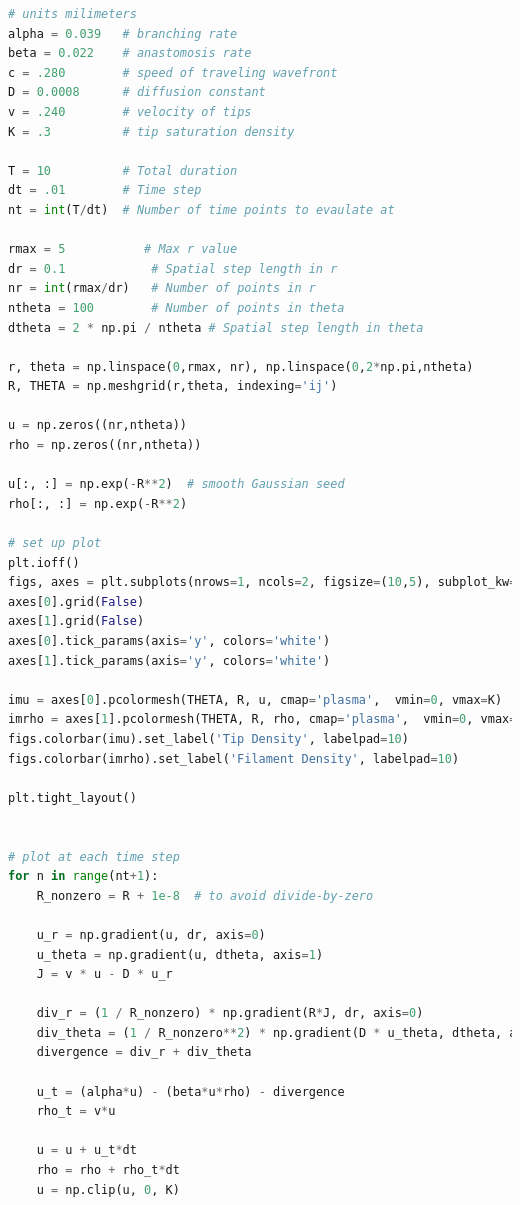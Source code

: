 \documentclass{article}
\begin{document}
\hypertarget{BA}{}
\begin{lstlisting}[language=Python, caption=Tip and Filament Density (with Branching and Anastomosis) Code]
# units milimeters
alpha = 0.039   # branching rate
beta = 0.022    # anastomosis rate 
c = .280        # speed of traveling wavefront
D = 0.0008      # diffusion constant 
v = .240        # velocity of tips
K = .3          # tip saturation density

T = 10          # Total duration
dt = .01        # Time step
nt = int(T/dt)  # Number of time points to evaulate at

rmax = 5           # Max r value
dr = 0.1            # Spatial step length in r
nr = int(rmax/dr)   # Number of points in r
ntheta = 100        # Number of points in theta
dtheta = 2 * np.pi / ntheta # Spatial step length in theta

r, theta = np.linspace(0,rmax, nr), np.linspace(0,2*np.pi,ntheta)
R, THETA = np.meshgrid(r,theta, indexing='ij')

u = np.zeros((nr,ntheta))
rho = np.zeros((nr,ntheta))

u[:, :] = np.exp(-R**2)  # smooth Gaussian seed
rho[:, :] = np.exp(-R**2)

# set up plot
plt.ioff()
figs, axes = plt.subplots(nrows=1, ncols=2, figsize=(10,5), subplot_kw={'projection': 'polar'})
axes[0].grid(False)
axes[1].grid(False)
axes[0].tick_params(axis='y', colors='white') 
axes[1].tick_params(axis='y', colors='white') 

imu = axes[0].pcolormesh(THETA, R, u, cmap='plasma',  vmin=0, vmax=K)
imrho = axes[1].pcolormesh(THETA, R, rho, cmap='plasma',  vmin=0, vmax=1.5)
figs.colorbar(imu).set_label('Tip Density', labelpad=10)
figs.colorbar(imrho).set_label('Filament Density', labelpad=10)

plt.tight_layout()


# plot at each time step
for n in range(nt+1):
    R_nonzero = R + 1e-8  # to avoid divide-by-zero

    u_r = np.gradient(u, dr, axis=0)
    u_theta = np.gradient(u, dtheta, axis=1)
    J = v * u - D * u_r

    div_r = (1 / R_nonzero) * np.gradient(R*J, dr, axis=0)
    div_theta = (1 / R_nonzero**2) * np.gradient(D * u_theta, dtheta, axis=1)
    divergence = div_r + div_theta

    u_t = (alpha*u) - (beta*u*rho) - divergence
    rho_t = v*u

    u = u + u_t*dt
    rho = rho + rho_t*dt
    u = np.clip(u, 0, K)



\end{lstlisting}
\end{document}

